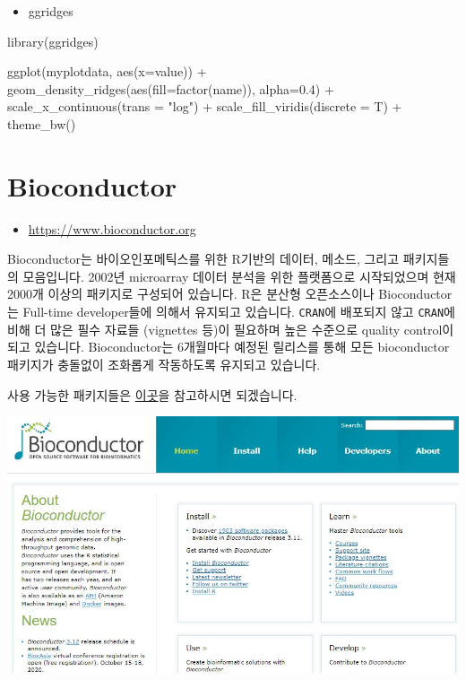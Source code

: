 \documentclass[
]{book}
\newenvironment{Shaded}{\begin{snugshade}}{\end{snugshade}}
\newcommand{\AttributeTok}[1]{\textcolor[rgb]{0.77,0.63,0.00}{#1}}
\newcommand{\FloatTok}[1]{\textcolor[rgb]{0.00,0.00,0.81}{#1}}
\newcommand{\FunctionTok}[1]{\textcolor[rgb]{0.00,0.00,0.00}{#1}}
\newcommand{\NormalTok}[1]{#1}
\newcommand{\SpecialCharTok}[1]{\textcolor[rgb]{0.00,0.00,0.00}{#1}}
\newcommand{\StringTok}[1]{\textcolor[rgb]{0.31,0.60,0.02}{#1}}
\providecommand{\tightlist}{%
  \setlength{\itemsep}{0pt}\setlength{\parskip}{0pt}}
\begin{document}
\begin{itemize}
\tightlist
\item
  ggridges
\end{itemize}

\begin{Shaded}
\begin{Highlighting}[]
\FunctionTok{library}\NormalTok{(ggridges)}

\FunctionTok{ggplot}\NormalTok{(myplotdata, }\FunctionTok{aes}\NormalTok{(}\AttributeTok{x=}\NormalTok{value)) }\SpecialCharTok{+}
  \FunctionTok{geom\_density\_ridges}\NormalTok{(}\FunctionTok{aes}\NormalTok{(}\AttributeTok{fill=}\FunctionTok{factor}\NormalTok{(name)), }\AttributeTok{alpha=}\FloatTok{0.4}\NormalTok{) }\SpecialCharTok{+}
  \FunctionTok{scale\_x\_continuous}\NormalTok{(}\AttributeTok{trans =} \StringTok{"log"}\NormalTok{) }\SpecialCharTok{+}
  \FunctionTok{scale\_fill\_viridis}\NormalTok{(}\AttributeTok{discrete =}\NormalTok{ T) }\SpecialCharTok{+}
  \FunctionTok{theme\_bw}\NormalTok{()}
\end{Highlighting}
\end{Shaded}

\hypertarget{bioconductor}{%
\chapter{Bioconductor}\label{bioconductor}}

\begin{itemize}
\tightlist
\item
  \url{https://www.bioconductor.org}
\end{itemize}

Bioconductor는 바이오인포메틱스를 위한 R기반의 데이터, 메소드, 그리고 패키지들의 모음입니다. 2002년 microarray 데이터 분석을 위한 플랫폼으로 시작되었으며 현재 2000개 이상의 패키지로 구성되어 있습니다. R은 분산형 오픈소스이나 Bioconductor는 Full-time developer들에 의해서 유지되고 있습니다. \texttt{CRAN}에 배포되지 않고 \texttt{CRAN}에 비해 더 많은 필수 자료들 (vignettes 등)이 필요하며 높은 수준으로 quality control이 되고 있습니다. Bioconductor는 6개월마다 예정된 릴리스를 통해 모든 bioconductor 패키지가 충돌없이 조화롭게 작동하도록 유지되고 있습니다.

사용 가능한 패키지들은 \href{http://bioconductor.org/packages/release/BiocViews.html\#___Software}{이곳}을 참고하시면 되겠습니다.

\includegraphics[width=6.25in,height=\textheight]{images/04/bioconductor.JPG}
\end{document}
